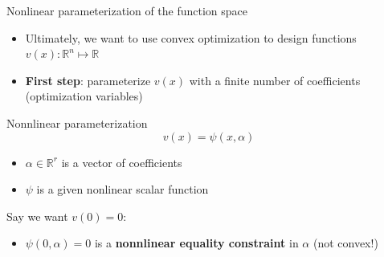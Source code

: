 \documentclass[aspectratio=169]{beamer}
\begin{document}
\begin{frame}{Nonlinear parameterization of the function space}
\begin{itemize}
\item
Ultimately, we want to use convex optimization to design functions $v(x) : \mathbb R^n \mapsto \mathbb R$
\item
\textbf{First step}: parameterize $v(x)$ with a finite number of coefficients (optimization variables)
\end{itemize}
\begin{block}{Nonnlinear parameterization}
$$
v(x) = \psi (x, \alpha)
$$
\vspace{-5mm}
\begin{itemize}
\item
$\alpha \in \mathbb R^r$ is a vector of coefficients
\item
$\psi$ is a given nonlinear scalar function
\end{itemize}
\end{block}
Say we want $v(0) = 0$:
\begin{itemize}

\item
$\psi (0, \alpha) = 0$ is a \textbf{nonnlinear equality constraint} in $\alpha$ (not convex!)
\end{itemize}
\end{frame}
\end{document}
